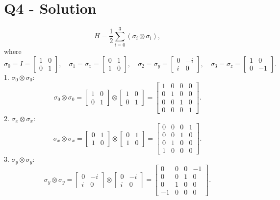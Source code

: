 \documentclass{article}
\begin{document}
\section*{Q4 - Solution}
\[
H = \frac{1}{2} \sum_{i=0}^3 (\sigma_i \otimes \sigma_i),
\]
where
\[
\sigma_0 = I = \begin{bmatrix} 1 & 0 \\ 0 & 1 \end{bmatrix}, \quad
\sigma_1 = \sigma_x = \begin{bmatrix} 0 & 1 \\ 1 & 0 \end{bmatrix}, \quad
\sigma_2 = \sigma_y = \begin{bmatrix} 0 & -i \\ i & 0 \end{bmatrix}, \quad
\sigma_3 = \sigma_z = \begin{bmatrix} 1 & 0 \\ 0 & -1 \end{bmatrix}.
\]
1. \( \sigma_0 \otimes \sigma_0 \):
\[
\sigma_0 \otimes \sigma_0 = 
\begin{bmatrix}
1 & 0 \\
0 & 1
\end{bmatrix} \otimes 
\begin{bmatrix}
1 & 0 \\
0 & 1
\end{bmatrix} =
\begin{bmatrix}
1 & 0 & 0 & 0 \\
0 & 1 & 0 & 0 \\
0 & 0 & 1 & 0 \\
0 & 0 & 0 & 1
\end{bmatrix}.
\]
2. \( \sigma_x \otimes \sigma_x \):
\[
\sigma_x \otimes \sigma_x =
\begin{bmatrix}
0 & 1 \\
1 & 0
\end{bmatrix} \otimes
\begin{bmatrix}
0 & 1 \\
1 & 0
\end{bmatrix} =
\begin{bmatrix}
0 & 0 & 0 & 1 \\
0 & 0 & 1 & 0 \\
0 & 1 & 0 & 0 \\
1 & 0 & 0 & 0
\end{bmatrix}.
\]
3. \( \sigma_y \otimes \sigma_y \):
\[
\sigma_y \otimes \sigma_y =
\begin{bmatrix}
0 & -i \\
i & 0
\end{bmatrix} \otimes
\begin{bmatrix}
0 & -i \\
i & 0
\end{bmatrix} =
\begin{bmatrix}
0 & 0 & 0 & -1 \\
0 & 0 & 1 & 0 \\
0 & 1 & 0 & 0 \\
-1 & 0 & 0 & 0
\end{bmatrix}.
\]
\end{document}
